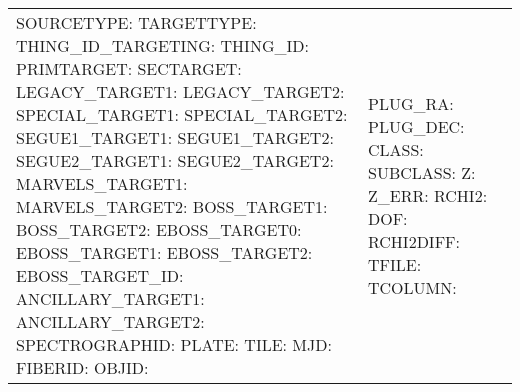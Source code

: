 \documentclass[onecolumn]{aa}
\begin{document}
\begin{table}
\begin{center}
\begin{tabular}{ L{3.5cm} L{4cm} L{11cm} }
SOURCETYPE:  \newline 
TARGETTYPE:  \newline 
THING\_ID\_TARGETING:  \newline 
THING\_ID:  \newline 
PRIMTARGET:  \newline 
SECTARGET:  \newline 
LEGACY\_TARGET1:  \newline 
LEGACY\_TARGET2:  \newline 
SPECIAL\_TARGET1:  \newline 
SPECIAL\_TARGET2:  \newline 
SEGUE1\_TARGET1:  \newline 
SEGUE1\_TARGET2:  \newline 
SEGUE2\_TARGET1:  \newline 
SEGUE2\_TARGET2:  \newline 
MARVELS\_TARGET1:  \newline 
MARVELS\_TARGET2:  \newline 
BOSS\_TARGET1:  \newline 
BOSS\_TARGET2:  \newline 
EBOSS\_TARGET0:  \newline 
EBOSS\_TARGET1:  \newline 
EBOSS\_TARGET2:  \newline 
EBOSS\_TARGET\_ID:  \newline 
ANCILLARY\_TARGET1:  \newline 
ANCILLARY\_TARGET2:  \newline 
SPECTROGRAPHID:  \newline 
PLATE:  \newline 
TILE:   \newline 
MJD:    \newline 
FIBERID:  \newline 
OBJID:  \newline 
 & 
PLUG\_RA:  \newline 
PLUG\_DEC:  \newline 
CLASS:  \newline 
SUBCLASS:  \newline 
Z:  \newline 
Z\_ERR:  \newline 
RCHI2:  \newline 
DOF:  \newline 
RCHI2DIFF:  \newline 
TFILE:  \newline 
TCOLUMN:  \newline 

\end{tabular}
\end{center}
\end{table}
\end{document}
